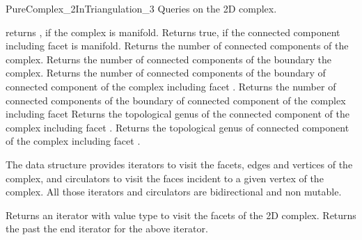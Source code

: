 \begin{ccRefConcept}{PureComplex_2InTriangulation_3}
Queries on the 2D complex. 

{returns , if the complex is manifold.}
\ccGlue
{}
{Returns true, if the   
connected component including  facet  is manifold.}
\ccGlue
{}
{Returns the number of connected components of the
complex.}
\ccGlue
{}
{Returns the number of connected components of the boundary
  the complex.}
\ccGlue
{}
{Returns the number of connected components of the boundary
of connected component of the complex including facet .}
\ccGlue
{}
{Returns the number of connected components of the boundary
of connected component of the complex including facet
}
\ccGlue
{}
{Returns the topological genus 
of the connected component of the complex including facet .}
\ccGlue
{}
{Returns the topological genus 
of connected component of the complex including facet .}






The data structure provides iterators  to visit  
the facets, edges and vertices of the complex, and circulators to visit the faces
incident to a given vertex of the complex.
All those iterators and circulators are bidirectional and
non mutable.

{Returns an iterator with value type  to visit the facets
of the 2D complex.}
\ccGlue
{}
{Returns the  past the end iterator for the above iterator.}


\end{ccRefConcept}
